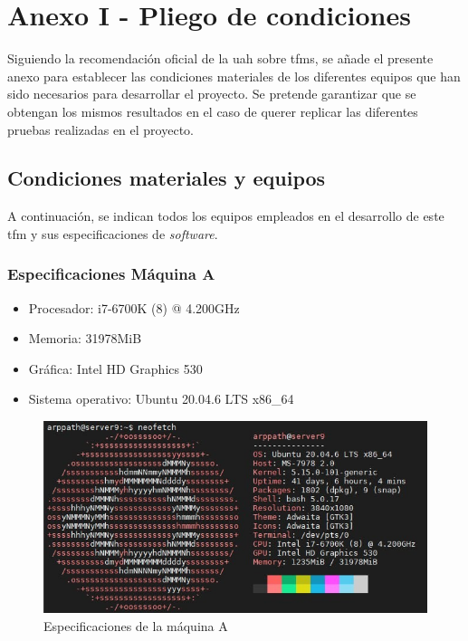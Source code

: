 \chapter{Anexo I - Pliego de condiciones}
\label{ch:anexoPliegoCondiciones}

Siguiendo la recomendación oficial de la \gls{uah} sobre \gls{tfm}s, se añade el presente anexo para establecer las condiciones materiales de los diferentes equipos que han sido necesarios para desarrollar el proyecto. Se pretende garantizar que se obtengan los mismos resultados en el caso de querer replicar las diferentes pruebas realizadas en el proyecto.

\section{Condiciones materiales y equipos}

A continuación, se indican todos los equipos empleados en el desarrollo de este \gls{tfm} y sus especificaciones de \textit{software}. 

\vspace{3mm}

\subsection{Especificaciones Máquina A} 
 \label{maquina_A}
 \begin{itemize}
     \item Procesador: i7-6700K (8) @ 4.200GHz
     \item Memoria: 31978MiB
     \item Gráfica: Intel HD Graphics 530
     \item Sistema operativo: Ubuntu 20.04.6 LTS x86\_64
 \end{itemize}
 \begin{figure}[ht!]
     \centering
     \includegraphics[width=13cm]{img/anexos/i20.jpg}
     \caption{Especificaciones de la máquina A}
     \label{fig:maquinaA}
 \end{figure}

